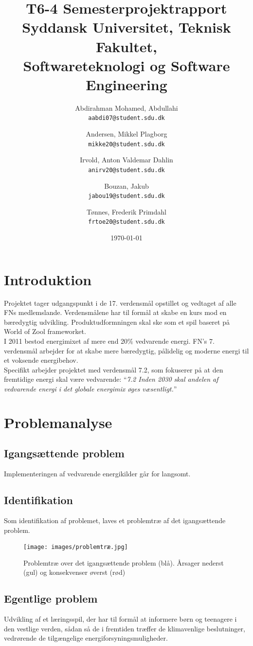 \documentclass[a4paper,12pt]{report}
\title{T6-4 Semesterprojektrapport\\ \large Syddansk Universitet, Teknisk Fakultet,\\ Softwareteknologi og Software Engineering}
\author{
	Abdirahman Mohamed, Abdullahi\\
	\texttt{aabdi07@student.sdu.dk}
	\and
	Andersen, Mikkel Plagborg\\
	\texttt{mikke20@student.sdu.dk}
	\and
	Irvold, Anton Valdemar Dahlin\\
	\texttt{anirv20@student.sdu.dk}
	\and
	Bouzan, Jakub\\
	\texttt{jabou19@student.sdu.dk}
	\and
	Tønnes, Frederik Primdahl\\
	\texttt{frtoe20@student.sdu.dk}	 
}
\begin{document}
\date{\today}
\maketitle
\tableofcontents

\section{Introduktion}
Projektet tager udgangspunkt i de 17. verdensmål opstillet og vedtaget af alle FNs medlemslande. Verdensmålene har til formål at skabe en kurs mod en bæredygtig udvikling. Produktudformningen skal ske som et spil baseret på World of Zool frameworket.\\ 

I 2011 bestod energimixet af mere end 20\% vedvarende energi. FN’s 7. verdensmål arbejder for at skabe mere bæredygtig, pålidelig og moderne energi til et voksende energibehov.\\

Specifikt arbejder projektet med verdensmål 7.2, som fokuserer på at den fremtidige energi skal være vedvarende: “\textit{7.2 Inden 2030 skal andelen af vedvarende energi i det globale energimix øges væsentligt.}”\cite{verdensmaalene}

\section{Problemanalyse}
\subsection{Igangsættende problem}
Implementeringen af vedvarende energikilder går for langsomt.

\subsection{Identifikation}
Som identifikation af problemet, laves et problemtræ af det igangsættende problem.

\begin{figure}[H]
	\texttt{[image: images/problemtræ.jpg]}
	\caption{Problemtræ over det igangsættende problem (blå). Årsager nederst (gul) og 		konsekvenser øverst (rød)}
	\label{fig:problemtræ}
\end{figure}

\subsection{Egentlige problem}
Udvikling af et læringsspil, der har til formål at informere børn og teenagere i den vestlige verden, sådan så de i fremtiden træffer de klimavenlige beslutninger, vedrørende de tilgængelige energiforsyningsmuligheder.
\end{document}
